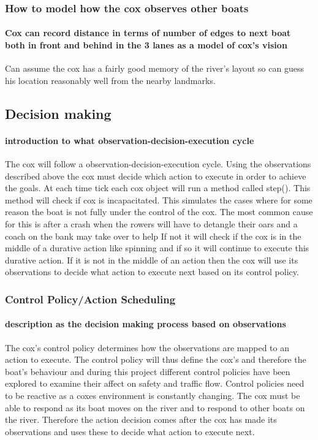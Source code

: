       \subsubsection{How to model how the cox observes other boats}
        \paragraph{Cox can record distance in terms of number of edges to next boat both in front and behind in the 3 lanes as a model of cox's vision}
        
      Can assume the cox has a fairly good memory of the river's layout so can guess his location reasonably well from the nearby landmarks.
  
      \subsection{Decision making}
      \paragraph{introduction to what observation-decision-execution cycle}
      The cox will follow a observation-decision-execution cycle. Using the observations described above the cox must decide which action to execute in order to achieve the goals. At each time tick each cox object will run a method called step(). This method will check if cox is incapacitated. This simulates the cases where for some reason the boat is not fully under the control of the cox. The most common cause for this is after a crash when the rowers will have to detangle their oars and a coach on the bank may take over to help If not it will check if the cox is in the middle of a durative action like spinning and if so it will continue to execute this durative action. If it is not in the middle of an action then the cox will use its observations to decide what action to execute next based on its control policy.
      
      \subsubsection{Control Policy/Action Scheduling}
      \paragraph{description as the decision making process based on observations}
      The cox's control policy determines how the observations are mapped to an action to execute. The control policy will thus define the cox's and therefore the boat's behaviour and during this project different control policies have been explored to examine their affect on safety and traffic flow. Control policies need to be reactive as a coxes environment is constantly changing. The cox must be able to respond as its boat moves on the river and to respond to other boats on the river. Therefore the action decision comes after the cox has made its observations and uses these to decide what action to execute next.
      
